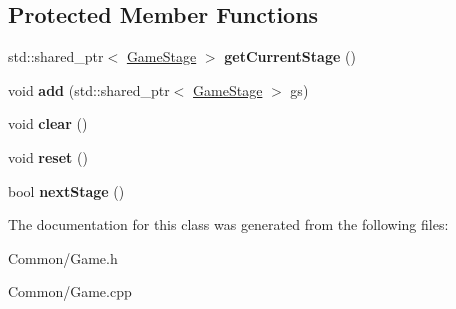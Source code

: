 \subsection*{Protected Member Functions}
\begin{DoxyCompactItemize}
\item 
\hypertarget{classbali_1_1_game_afa07e7a01ad2bb85b25dd5b253e2dc3e}{std\-::shared\-\_\-ptr$<$ \hyperlink{classbali_1_1_game_stage}{Game\-Stage} $>$ {\bfseries get\-Current\-Stage} ()}\label{classbali_1_1_game_afa07e7a01ad2bb85b25dd5b253e2dc3e}

\item 
\hypertarget{classbali_1_1_game_a5d68f710fa6a15c4e8ccc258ada2fe83}{void {\bfseries add} (std\-::shared\-\_\-ptr$<$ \hyperlink{classbali_1_1_game_stage}{Game\-Stage} $>$ gs)}\label{classbali_1_1_game_a5d68f710fa6a15c4e8ccc258ada2fe83}

\item 
\hypertarget{classbali_1_1_game_a0ec9e67bbb3c914b5864fdae31a985d8}{void {\bfseries clear} ()}\label{classbali_1_1_game_a0ec9e67bbb3c914b5864fdae31a985d8}

\item 
\hypertarget{classbali_1_1_game_a2fdfd9f3b74a10cced0ace3615dacc15}{void {\bfseries reset} ()}\label{classbali_1_1_game_a2fdfd9f3b74a10cced0ace3615dacc15}

\item 
\hypertarget{classbali_1_1_game_a5dbffdfdbc70c61c624314d1a761d5bf}{bool {\bfseries next\-Stage} ()}\label{classbali_1_1_game_a5dbffdfdbc70c61c624314d1a761d5bf}

\end{DoxyCompactItemize}


The documentation for this class was generated from the following files\-:\begin{DoxyCompactItemize}
\item 
Common/Game.\-h\item 
Common/Game.\-cpp\end{DoxyCompactItemize}
